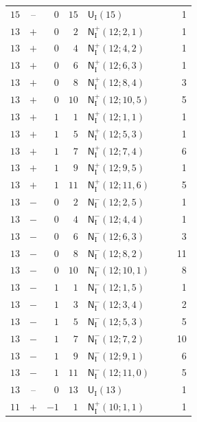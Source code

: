 \documentclass[10pt]{article}
\begin{document}
\begin{longtable}{@{}r c r r >{\RaggedRight\arraybackslash}p{0.48\linewidth} r@{}}
$15$ & $\text{--}$ & $0$ & $15$ & $\mathsf U_{\mathrm I}(15)$ & 1 \\
$13$ & $+$ & $0$ & $2$ & $\mathsf N_{\mathrm I}^{+}(12;2,1)$ & 1 \\
$13$ & $+$ & $0$ & $4$ & $\mathsf N_{\mathrm I}^{+}(12;4,2)$ & 1 \\
$13$ & $+$ & $0$ & $6$ & $\mathsf N_{\mathrm I}^{+}(12;6,3)$ & 1 \\
$13$ & $+$ & $0$ & $8$ & $\mathsf N_{\mathrm I}^{+}(12;8,4)$ & 3 \\
$13$ & $+$ & $0$ & $10$ & $\mathsf N_{\mathrm I}^{+}(12;10,5)$ & 5 \\
$13$ & $+$ & $1$ & $1$ & $\mathsf N_{\mathrm I}^{+}(12;1,1)$ & 1 \\
$13$ & $+$ & $1$ & $5$ & $\mathsf N_{\mathrm I}^{+}(12;5,3)$ & 1 \\
$13$ & $+$ & $1$ & $7$ & $\mathsf N_{\mathrm I}^{+}(12;7,4)$ & 6 \\
$13$ & $+$ & $1$ & $9$ & $\mathsf N_{\mathrm I}^{+}(12;9,5)$ & 1 \\
$13$ & $+$ & $1$ & $11$ & $\mathsf N_{\mathrm I}^{+}(12;11,6)$ & 5 \\
$13$ & $-$ & $0$ & $2$ & $\mathsf N_{\mathrm I}^{-}(12;2,5)$ & 1 \\
$13$ & $-$ & $0$ & $4$ & $\mathsf N_{\mathrm I}^{-}(12;4,4)$ & 1 \\
$13$ & $-$ & $0$ & $6$ & $\mathsf N_{\mathrm I}^{-}(12;6,3)$ & 3 \\
$13$ & $-$ & $0$ & $8$ & $\mathsf N_{\mathrm I}^{-}(12;8,2)$ & 11 \\
$13$ & $-$ & $0$ & $10$ & $\mathsf N_{\mathrm I}^{-}(12;10,1)$ & 8 \\
$13$ & $-$ & $1$ & $1$ & $\mathsf N_{\mathrm I}^{-}(12;1,5)$ & 1 \\
$13$ & $-$ & $1$ & $3$ & $\mathsf N_{\mathrm I}^{-}(12;3,4)$ & 2 \\
$13$ & $-$ & $1$ & $5$ & $\mathsf N_{\mathrm I}^{-}(12;5,3)$ & 5 \\
$13$ & $-$ & $1$ & $7$ & $\mathsf N_{\mathrm I}^{-}(12;7,2)$ & 10 \\
$13$ & $-$ & $1$ & $9$ & $\mathsf N_{\mathrm I}^{-}(12;9,1)$ & 6 \\
$13$ & $-$ & $1$ & $11$ & $\mathsf N_{\mathrm I}^{-}(12;11,0)$ & 5 \\
$13$ & $\text{--}$ & $0$ & $13$ & $\mathsf U_{\mathrm I}(13)$ & 1 \\
$11$ & $+$ & $-1$ & $1$ & $\mathsf N_{\mathrm I}^{+}(10;1,1)$ & 1 \\

\end{longtable}
\end{document}
